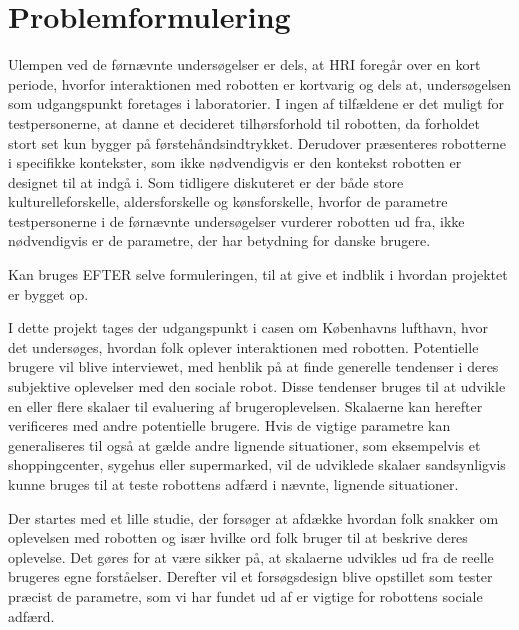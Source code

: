\section{Problemformulering}
\label{Problemformulering}
%
Ulempen ved de førnævnte undersøgelser er dels, at HRI foregår over en kort periode, hvorfor interaktionen med robotten er kortvarig og dels at, undersøgelsen som udgangspunkt foretages i laboratorier. I ingen af tilfældene er det muligt for testpersonerne, at danne et decideret tilhørsforhold til robotten, da forholdet stort set kun bygger på førstehåndsindtrykket. Derudover præsenteres robotterne i specifikke kontekster, som ikke nødvendigvis er den kontekst robotten er designet til at indgå i. Som tidligere diskuteret er der både store kulturelleforskelle, aldersforskelle og kønsforskelle, hvorfor de parametre testpersonerne i de førnævnte undersøgelser vurderer robotten ud fra, ikke nødvendigvis er de parametre, der har betydning for danske brugere. \blankline





Kan bruges EFTER selve formuleringen, til at give et indblik i hvordan projektet er bygget op. 

I dette projekt tages der udgangspunkt i casen om Københavns lufthavn, hvor det undersøges, hvordan folk oplever interaktionen med robotten. Potentielle brugere vil blive interviewet, med henblik på at finde generelle tendenser i deres subjektive oplevelser med den sociale robot. Disse tendenser bruges til at udvikle en eller flere skalaer til evaluering af brugeroplevelsen. Skalaerne kan herefter verificeres med andre potentielle brugere. Hvis de vigtige parametre kan generaliseres til også at gælde andre lignende situationer, som eksempelvis et shoppingcenter, sygehus eller supermarked, vil de udviklede skalaer sandsynligvis kunne bruges til at teste robottens adfærd i nævnte, lignende situationer.

Der startes med et lille studie, der forsøger at afdække hvordan folk snakker om oplevelsen med robotten og især hvilke ord folk bruger til at beskrive deres oplevelse. Det gøres for at være sikker på, at skalaerne udvikles ud fra de reelle brugeres egne forståelser. Derefter vil et forsøgsdesign blive opstillet som tester præcist de parametre, som vi har fundet ud af er vigtige for robottens sociale adfærd.